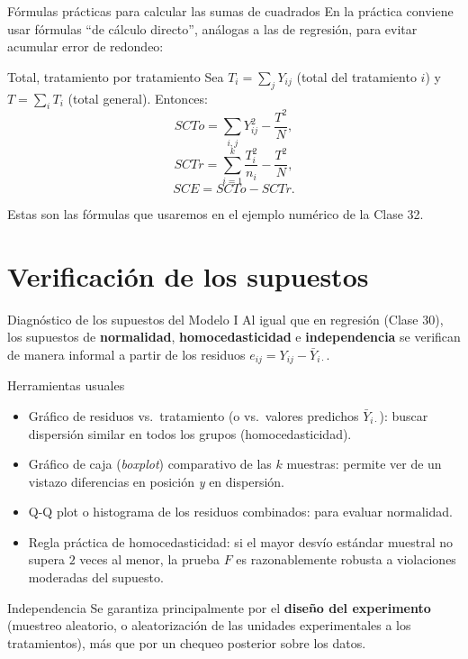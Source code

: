 \documentclass[aspectratio=169,11pt]{beamer}
\begin{document}
\begin{frame}{Fórmulas prácticas para calcular las sumas de cuadrados}
En la práctica conviene usar fórmulas ``de cálculo directo'', análogas a las de regresión, para evitar acumular error de redondeo:

\begin{block}{Total, tratamiento por tratamiento}
Sea $T_i = \sum_j Y_{ij}$ (total del tratamiento $i$) y $T = \sum_i T_i$ (total general). Entonces:
\[
SCTo = \sum_{i,j} Y_{ij}^2 - \frac{T^2}{N},
\]
\[
SCTr = \sum_{i=1}^k \frac{T_i^2}{n_i} - \frac{T^2}{N},
\]
\[
SCE = SCTo - SCTr.
\]
\end{block}

Estas son las fórmulas que usaremos en el ejemplo numérico de la Clase 32.
\end{frame}

\section{Verificación de los supuestos}

\begin{frame}{Diagnóstico de los supuestos del Modelo I}
Al igual que en regresión (Clase 30), los supuestos de \textbf{normalidad}, \textbf{homocedasticidad} e \textbf{independencia} se verifican de manera informal a partir de los residuos $e_{ij}=Y_{ij}-\bar Y_{i\cdot}$.

\begin{block}{Herramientas usuales}
\begin{itemize}
\item Gráfico de residuos vs.\ tratamiento (o vs.\ valores predichos $\bar Y_{i\cdot}$): buscar dispersión similar en todos los grupos (homocedasticidad).
\item Gráfico de caja (\emph{boxplot}) comparativo de las $k$ muestras: permite ver de un vistazo diferencias en posición \emph{y} en dispersión.
\item Q-Q plot o histograma de los residuos combinados: para evaluar normalidad.
\item Regla práctica de homocedasticidad: si el mayor desvío estándar muestral no supera $2$ veces al menor, la prueba $F$ es razonablemente robusta a violaciones moderadas del supuesto.
\end{itemize}
\end{block}

\begin{alertblock}{Independencia}
Se garantiza principalmente por el \textbf{diseño del experimento} (muestreo aleatorio, o aleatorización de las unidades experimentales a los tratamientos), más que por un chequeo posterior sobre los datos.
\end{alertblock}
\end{frame}
\end{document}
